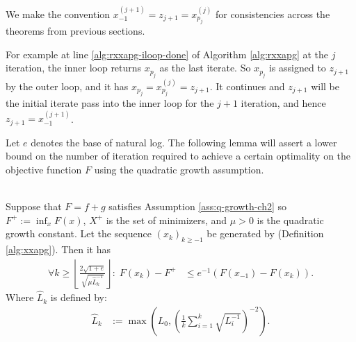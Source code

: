 \documentclass[12pt]{report}
\begin{document}
        We make the convention $x_{-1}^{(j + 1)} = z_{j + 1} = x_{p_j}^{(j)}$ for consistencies across the theorems from previous sections. 
        \par
        For example at line \ref{alg:rxxapg-iloop-done} of Algorithm \ref{alg:rxxapg} at the $j$ iteration, the inner loop returns $x_{p_j}$ as the last iterate. 
        So $x_{p_j}$ is assigned to $z_{j + 1}$ by the outer loop, and it has $x_{p_j} = x_{p_j}^{(j)} = z_{j + 1}$. 
        It continues and $z_{j + 1}$ will be the initial iterate pass into the inner loop for the $j + 1$ iteration, and hence $z_{j + 1} =x_{-1}^{(j + 1)}$. 
        \par
        Let $e$ denotes the base of natural log. 
        The following lemma will assert a lower bound on the number of iteration required to achieve a certain optimality on the objective function $F$ using the quadratic growth assumption. 
        \begin{lemma}\;\label{lemma:prog-ratio}\\
            Suppose that $F = f + g$ satisfies Assumption \ref{ass:q-growth-ch2} so $F^+ := \inf_xF(x)$, $X^+$ is the set of minimizers, and $\mu > 0$ is the quadratic growth constant. 
            Let the sequence $(x_k)_{k \ge -1}$ be generated by \XXAPG{} (Definition \ref{alg:xxapg}). 
            Then it has
            \begin{align*}
                \forall k \ge \left\lfloor \frac{2\sqrt{1 + e}}{\sqrt{\mu\widehat L_k^{-1}}}\right\rfloor:\; 
                F(x_k) - F^+  &\le e^{-1} (F(x_{-1}) - F(x_k)). 
            \end{align*} 
            Where $\widehat L_k$ is defined by:
            \begin{align*}
                \widehat L_k &:= \max\left(
                    L_0, \left(
                        \frac{1}{k} \sum_{i = 1}^{k} \sqrt{L_i^{-1}}
                    \right)^{-2}
                \right). 
            \end{align*}
        \end{lemma}
\end{document}
